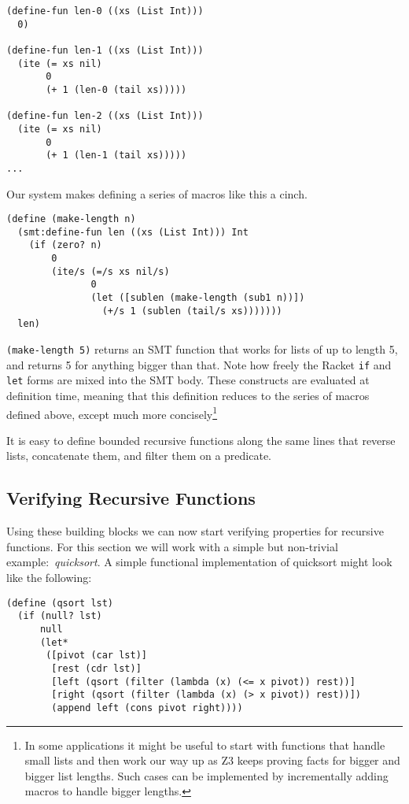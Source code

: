 \begin{verbatim}
(define-fun len-0 ((xs (List Int)))
  0)

(define-fun len-1 ((xs (List Int)))
  (ite (= xs nil)
       0
       (+ 1 (len-0 (tail xs)))))

(define-fun len-2 ((xs (List Int)))
  (ite (= xs nil)
       0
       (+ 1 (len-1 (tail xs)))))
...
\end{verbatim}

Our system makes defining a series of macros like this a cinch.

\begin{verbatim}
(define (make-length n)
  (smt:define-fun len ((xs (List Int))) Int
    (if (zero? n)
        0
        (ite/s (=/s xs nil/s)
               0
               (let ([sublen (make-length (sub1 n))])
                 (+/s 1 (sublen (tail/s xs)))))))
  len)
\end{verbatim}

\texttt{(make-length 5)} returns an SMT function that works for lists of up to
length 5, and returns 5 for anything bigger than that. Note how freely the
Racket \texttt{if} and \texttt{let} forms are mixed into the SMT body. These
constructs are evaluated at definition time, meaning that this definition
reduces to the series of macros defined above, except much more
concisely\footnote{In some applications it might be useful to start with
functions that handle small lists and then work our way up as Z3 keeps proving
facts for bigger and bigger list lengths. Such cases can be implemented by
incrementally adding macros to handle bigger lengths.}

It is easy to define bounded recursive functions along the same lines that
reverse lists, concatenate them, and filter them on a predicate.

\subsection{Verifying Recursive Functions}

Using these building blocks we can now start verifying properties for
recursive functions. For this section we will work with a simple but
non-trivial example:~\textit{quicksort}. A simple functional
implementation of quicksort might look like the following:

\begin{verbatim}
(define (qsort lst)
  (if (null? lst)
      null
      (let*
       ([pivot (car lst)]
        [rest (cdr lst)]
        [left (qsort (filter (lambda (x) (<= x pivot)) rest))]
        [right (qsort (filter (lambda (x) (> x pivot)) rest))])
        (append left (cons pivot right))))
\end{verbatim}

